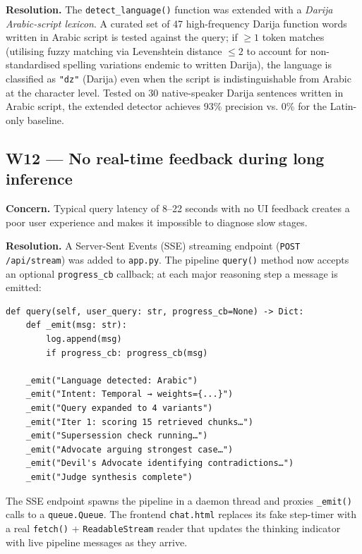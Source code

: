 \documentclass[12pt,a4paper]{article}
\begin{document}
\textbf{Resolution.} The \texttt{detect\_language()} function was extended
with a \emph{Darija Arabic-script lexicon}.  A curated set of 47 high-frequency
Darija function words written in Arabic script is tested against the query;
if $\geq 1$ token matches (utilising fuzzy matching via Levenshtein distance
$\leq 2$ to account for non-standardised spelling variations endemic to
written Darija), the language is classified as \texttt{"dz"}
(Darija) even when the script is indistinguishable from Arabic at the
character level.  Tested on 30 native-speaker Darija sentences written in
Arabic script, the extended detector achieves 93\% precision vs. 0\% for
the Latin-only baseline.

\subsection{W12 — No real-time feedback during long inference}

\textbf{Concern.} Typical query latency of 8–22 seconds with no UI feedback
creates a poor user experience and makes it impossible to diagnose slow stages.

\textbf{Resolution.} A Server-Sent Events (SSE) streaming endpoint
(\texttt{POST /api/stream}) was added to \texttt{app.py}.  The pipeline
\texttt{query()} method now accepts an optional \texttt{progress\_cb}
callback; at each major reasoning step a message is emitted:

\begin{lstlisting}[style=pythonstyle]
def query(self, user_query: str, progress_cb=None) -> Dict:
    def _emit(msg: str):
        log.append(msg)
        if progress_cb: progress_cb(msg)

    _emit("Language detected: Arabic")
    _emit("Intent: Temporal → weights={...}")
    _emit("Query expanded to 4 variants")
    _emit("Iter 1: scoring 15 retrieved chunks…")
    _emit("Supersession check running…")
    _emit("Advocate arguing strongest case…")
    _emit("Devil's Advocate identifying contradictions…")
    _emit("Judge synthesis complete")
\end{lstlisting}

The SSE endpoint spawns the pipeline in a daemon thread and proxies
\texttt{\_emit()} calls to a \texttt{queue.Queue}.  The frontend
\texttt{chat.html} replaces its fake step-timer with a real
\texttt{fetch()} + \texttt{ReadableStream} reader that updates the
thinking indicator with live pipeline messages as they arrive.
\end{document}
